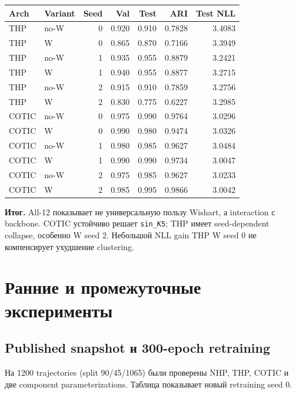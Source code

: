 \documentclass[11pt,a4paper]{article}
\newcommand{\code}[1]{\texttt{#1}}
\newcommand{\boxnote}[2]{%
  \begin{center}\setlength{\fboxsep}{9pt}%
  \colorbox{#1}{\begin{minipage}{0.94\textwidth}\raggedright #2\par\end{minipage}}
  \end{center}}
\newcommand{\verdict}[1]{\boxnote{lightred}{\textbf{Итог.} #1}}
\begin{document}
\begin{center}
\small
\begin{tabular}{llrrrrr}
\toprule
Arch & Variant & Seed & Val & Test & ARI & Test NLL \\
\midrule
THP & no-W & 0 & 0.920 & 0.910 & 0.7828 & 3.4083 \\
THP & W & 0 & 0.865 & 0.870 & 0.7166 & 3.3949 \\
THP & no-W & 1 & 0.935 & 0.955 & 0.8879 & 3.2421 \\
THP & W & 1 & 0.940 & 0.955 & 0.8877 & 3.2715 \\
THP & no-W & 2 & 0.915 & 0.910 & 0.7859 & 3.2756 \\
THP & W & 2 & 0.830 & 0.775 & 0.6227 & 3.2985 \\
\midrule
COTIC & no-W & 0 & 0.975 & 0.990 & 0.9764 & 3.0296 \\
COTIC & W & 0 & 0.990 & 0.980 & 0.9474 & 3.0326 \\
COTIC & no-W & 1 & 0.980 & 0.985 & 0.9627 & 3.0484 \\
COTIC & W & 1 & 0.990 & 0.990 & 0.9734 & 3.0047 \\
COTIC & no-W & 2 & 0.975 & 0.985 & 0.9627 & 3.0233 \\
COTIC & W & 2 & 0.985 & 0.995 & 0.9866 & 3.0042 \\
\bottomrule
\end{tabular}
\end{center}

\verdict{All-12 показывает не универсальную пользу Wishart, а interaction с
backbone. COTIC устойчиво решает \code{sin\_K5}; THP имеет seed-dependent
collapse, особенно W seed 2. Небольшой NLL gain THP W seed 0 не компенсирует
ухудшение clustering.}

\section{Ранние и промежуточные эксперименты}

\subsection{Published snapshot и 300-epoch retraining}

На 1200 trajectories (split 90/45/1065) были проверены NHP, THP, COTIC и две
component parameterizations. Таблица показывает новый retraining seed 0.
\end{document}
